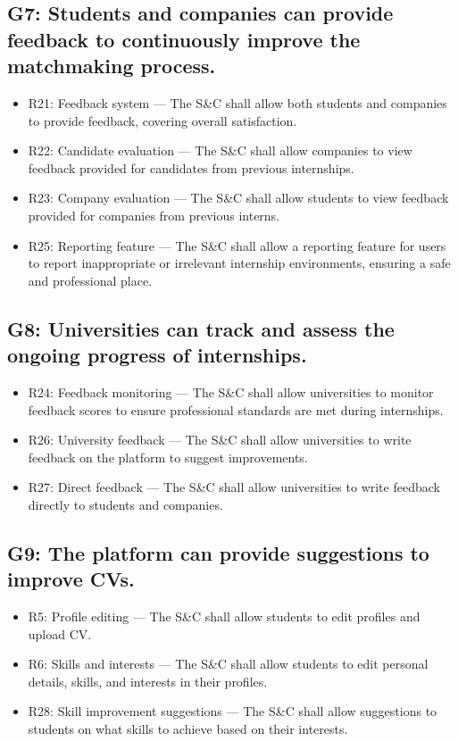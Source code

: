 \subsection{G7: Students and companies can provide feedback to continuously improve the matchmaking process.}
\begin{itemize}
    \item R21: Feedback system — The S\&C shall allow both students and companies to provide feedback, covering overall satisfaction.
    \item R22: Candidate evaluation — The S\&C shall allow companies to view feedback provided for candidates from previous internships.
    \item R23: Company evaluation — The S\&C shall allow students to view feedback provided for companies from previous interns.
    \item R25: Reporting feature — The S\&C shall allow a reporting feature for users to report inappropriate or irrelevant internship environments, ensuring a safe and professional place.
\end{itemize}

\subsection{G8: Universities can track and assess the ongoing progress of internships.}
\begin{itemize}
    \item R24: Feedback monitoring — The S\&C shall allow universities to monitor feedback scores to ensure professional standards are met during internships.
    \item R26: University feedback — The S\&C shall allow universities to write feedback on the platform to suggest improvements.
    \item R27: Direct feedback — The S\&C shall allow universities to write feedback directly to students and companies.
\end{itemize}

\subsection{G9: The platform can provide suggestions to improve CVs.}
\begin{itemize}
    \item R5: Profile editing — The S\&C shall allow students to edit profiles and upload CV.
    \item R6: Skills and interests — The S\&C shall allow students to edit personal details, skills, and interests in their profiles.
    \item R28: Skill improvement suggestions — The S\&C shall allow suggestions to students on what skills to achieve based on their interests.
\end{itemize}

